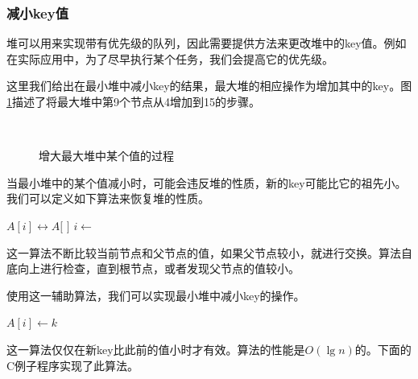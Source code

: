 \documentclass[b5paper]{ctexart}
\begin{document}
\subsubsection{减小key值}

堆可以用来实现带有优先级的队列，因此需要提供方法来更改堆中的key值。例如在实际应用中，为了尽早执行某个任务，我们会提高它的优先级。

这里我们给出在最小堆中减小key的结果，最大堆的相应操作为增加其中的key。图\ref{fig:decrease-key-2}描述了将最大堆中第9个节点从4增加到15的步骤。

\captionsetup[subfigure]{labelformat=empty, margin=10pt}
\begin{figure}[htbp]
    \centering
     \\
    \caption{增大最大堆中某个值的过程} \label{fig:decrease-key-2}
\end{figure}
\captionsetup[subfigure]{labelformat=parens}

当最小堆中的某个值减小时，可能会违反堆的性质，新的key可能比它的祖先小。我们可以定义如下算法来恢复堆的性质。

\begin{algorithmic}[1]
    \State {} $A[i] \leftrightarrow A[$  $]$
    \State $i \gets$  
  \EndWhile
\EndFunction
\end{algorithmic}

这一算法不断比较当前节点和父节点的值，如果父节点较小，就进行交换。算法自底向上进行检查，直到根节点，或者发现父节点的值较小。

使用这一辅助算法，我们可以实现最小堆中减小key的操作。

\begin{algorithmic}[1]
    \State $A[i] \gets k$
    \State {}
  \EndIf
\EndFunction
\end{algorithmic}

这一算法仅仅在新key比此前的值小时才有效。算法的性能是$O(\lg n)$的。下面的C例子程序实现了此算法。
\end{document}
